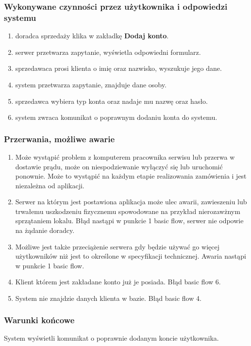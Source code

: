 \documentclass{article}
\begin{document}
\subsubsection{Wykonywane czynności przez użytkownika i odpowiedzi systemu}
\begin{enumerate}
    \item doradca sprzedaży klika w zakładkę \textbf{Dodaj konto}.
    \item serwer przetwarza zapytanie, wyświetla odpowiedni formularz.
    \item sprzedawaca prosi klienta o imię oraz nazwisko, wyszukuje jego dane.
    \item system przetwarza zapytanie, znajduje dane osoby.
    \item sprzedawca wybiera typ konta oraz nadaje mu nazwę oraz hasło.
    \item system zwraca komunikat o poprawnym dodaniu konta do systemu.
\end{enumerate}
\subsubsection{Przerwania, możliwe awarie}
\begin{enumerate}
    \item Może wystąpić problem z komputerem pracownika serwisu lub przerwa w dostawie prądu, może on niespodziewanie wyłączyć się lub uruchomić ponownie. Może to wystąpić na każdym etapie realizowania zamówienia i jest niezależna od aplikacji.
    \item Serwer na którym jest postawiona aplikacja może ulec awarii, zawieszeniu lub trwałemu uszkodzeniu fizycznemu spowodowane na przykład nierozawżnym sprzątaniem lokalu. Błąd nastąpi w punkcie 1 basic flow, serwer nie odpowie na żądanie doradcy.
    \item Możliwe jest także przeciążenie serwera gdy będzie używać go więcej użytkowników niż jest to określone w specyfikacji technicznej. Awaria nastąpi w punkcie 1 basic flow.
    \item Klient którem jest zakładane konto już je posiada. Błąd basic flow 6.
    \item System nie znajdzie danych klienta w bazie. Błąd basic flow 4.
\end{enumerate}
\subsubsection{Warunki końcowe}
System wyświetli komunikat o poprawnie dodanym koncie użytkownika.
\end{document}
